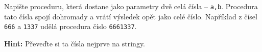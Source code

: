 \question[50]
Napište proceduru, která dostane jako parametry dvě celá čísla -- \texttt{a,b}.
Procedura tato čísla spojí dohromady a vrátí výsledek opět jako celé číslo.
Například z čísel \texttt{666} a \texttt{1337} udělá procedura číslo
\texttt{6661337}.

\textbf{Hint:} Převeďte si ta čísla nejprve na stringy.